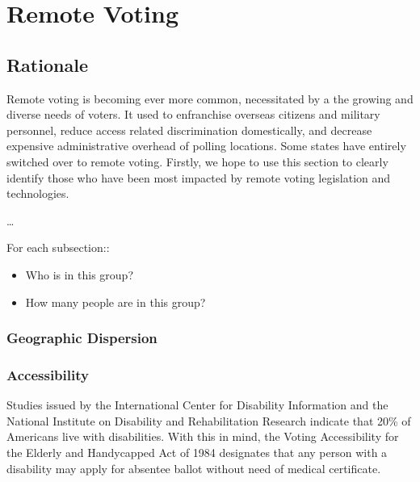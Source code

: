 \chapter{Remote Voting}
\label{chapter:remote_voting}

\section{Rationale}
Remote voting is becoming ever more common, necessitated by a the growing and diverse needs of voters. It used to enfranchise overseas citizens and military personnel, reduce access related discrimination domestically, and decrease expensive administrative overhead of polling locations. Some states have entirely switched over to remote voting. Firstly, we hope to use this section to clearly identify those who have been most impacted by remote voting legislation and technologies. 

\ldots

For each subsection::
\begin{itemize}
\item Who is in this group?
\item How many people are in this group?
\end{itemize}

\subsection{Geographic Dispersion}

\subsection{Accessibility}
Studies issued by the International Center for Disability Information and the National Institute on Disability and Rehabilitation Research indicate that 20\% of Americans live with disabilities. With this in mind, the Voting Accessibility for the Elderly and Handycapped Act of 1984 designates that any person with a disability may apply for absentee ballot without need of medical certificate.



